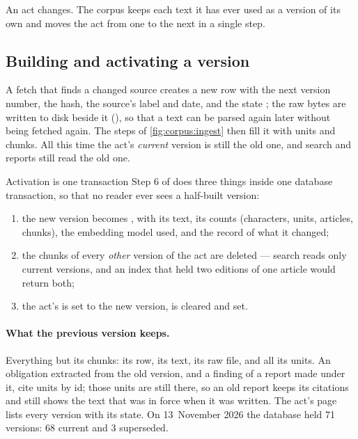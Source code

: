 An act changes. The corpus keeps each text it has ever used as a version of its own and
moves the act from one to the next in a single step.

\subsection{Building and activating a version}\label{sec:corpus:activate}

A fetch that finds a changed source creates a new  row with the
next version number, the hash, the source's label and date, and the state ; the
raw bytes are written to disk beside it (), so that a text can be parsed
again later without being fetched again. The steps of \cref{fig:corpus:ingest} then fill it
with units and chunks. All this time the act's \emph{current} version is still the old one,
and search and reports still read the old one.

\begin{codebox}{Activation is one transaction}
Step 6 of  does three things inside one database transaction, so that no reader
ever sees a half-built version:
\begin{enumerate}
  \item the new version becomes , with its text, its counts (characters, units,
    articles, chunks), the embedding model used, and the record of what it changed;
  \item the chunks of every \emph{other} version of the act are deleted --- search reads only
    current versions, and an index that held two editions of one article would return both;
  \item the act's  is set to the new version,  is
    cleared and  set.
\end{enumerate}
\end{codebox}

\paragraph{What the previous version keeps.} Everything but its chunks: its row, its text,
its raw file, and all its units. An obligation extracted from the old version, and a finding
of a report made under it, cite units by id; those units are still there, so an old report
keeps its citations and still shows the text that was in force when it was written. The act's
page lists every version with its state. On 13~November 2026 the database held 71 versions:
68 current and 3 superseded.

